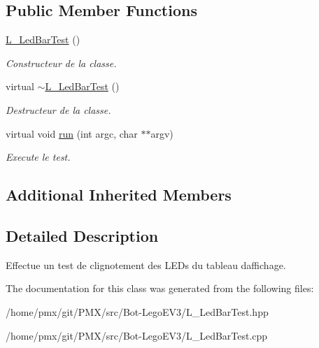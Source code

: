 \subsection*{Public Member Functions}
\begin{DoxyCompactItemize}
\item 
\mbox{\label{classL__LedBarTest_a71f4fd0cfa008cd768bac324408c6e66}} 
\hyperlink{classL__LedBarTest_a71f4fd0cfa008cd768bac324408c6e66}{L\+\_\+\+Led\+Bar\+Test} ()
\begin{DoxyCompactList}\small\item\em Constructeur de la classe. \end{DoxyCompactList}\item 
\mbox{\label{classL__LedBarTest_ad5a34a5eaedd63e43ee778498d384659}} 
virtual \hyperlink{classL__LedBarTest_ad5a34a5eaedd63e43ee778498d384659}{$\sim$\+L\+\_\+\+Led\+Bar\+Test} ()
\begin{DoxyCompactList}\small\item\em Destructeur de la classe. \end{DoxyCompactList}\item 
\mbox{\label{classL__LedBarTest_ade4267d18949f8e4150410f6a18743f8}} 
virtual void \hyperlink{classL__LedBarTest_ade4267d18949f8e4150410f6a18743f8}{run} (int argc, char $\ast$$\ast$argv)
\begin{DoxyCompactList}\small\item\em Execute le test. \end{DoxyCompactList}\end{DoxyCompactItemize}
\subsection*{Additional Inherited Members}


\subsection{Detailed Description}
Effectue un test de clignotement des L\+E\+Ds du tableau d\textquotesingle{}affichage. 

The documentation for this class was generated from the following files\+:\begin{DoxyCompactItemize}
\item 
/home/pmx/git/\+P\+M\+X/src/\+Bot-\/\+Lego\+E\+V3/L\+\_\+\+Led\+Bar\+Test.\+hpp\item 
/home/pmx/git/\+P\+M\+X/src/\+Bot-\/\+Lego\+E\+V3/L\+\_\+\+Led\+Bar\+Test.\+cpp\end{DoxyCompactItemize}
